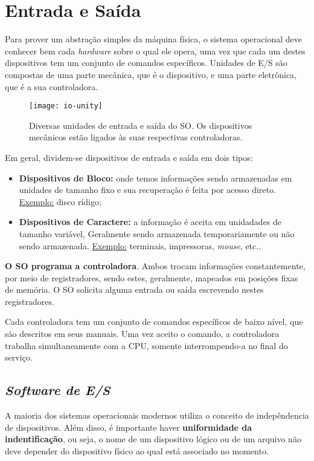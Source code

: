 \chapter{Entrada e Saída}

Para prover um abstração simples da máquina física, o sistema operacional deve conhecer bem cada \textit{hardware} sobre o qual ele opera, uma vez que cada um destes dispositivos tem um conjunto de comandos específicos. Unidades de E/S são compostas de uma parte mecânica, que é o dispositivo, e uma parte eletrônica, que é a sua controladora.

\begin{figure}
  \texttt{[image: io-unity]}
  \caption{Diversas unidades de entrada e saída do SO. Os dispositivos mecânicos estão ligados às suas respectivas controladoras.}
  \label{fig:io-unity}
\end{figure}

Em geral, dividem-se dispositivos de entrada e saída em dois tipos:
\begin{itemize}
  \item \textbf{Dispositivos de Bloco:} onde temos informações sendo armazenadas em unidades de tamanho fixo e sua recuperação é feita por acesso direto. \underline{Exemplo:} disco rídigo;

  \item \textbf{Dispositivos de Caractere:} a informação é aceita em unidadades de tamanho variável, Geralmente sendo armazenada temporariamente ou não sendo armazenada. \underline{Exemplo:} terminais, impressoras, \textit{mouse}, etc..
\end{itemize}

\textbf{O SO programa a controladora}. Ambos trocam informações constantemente, por meio de registradores, sendo estes, geralmente, mapeados em posições fixas de memória. O SO solicita alguma entrada ou saída escrevendo nestes registradores.

Cada controladora tem um conjunto de comandos específicos de baixo nível, que são descritos em seus manuais. Uma vez aceito o comando, a controladora trabalha simultaneamente com a CPU, somente interrompendo-a no final do serviço.







\section{\textit{Software de E/S}}
A maioria dos sistemas operacionais modernos utiliza o conceito de indepêndencia de dispositivos. Além disso, é importante haver \textbf{uniformidade da indentificação}, ou seja, o nome de um dispositivo lógico ou de um arquivo não deve depender do dispositivo físico ao qual está associado no momento.

